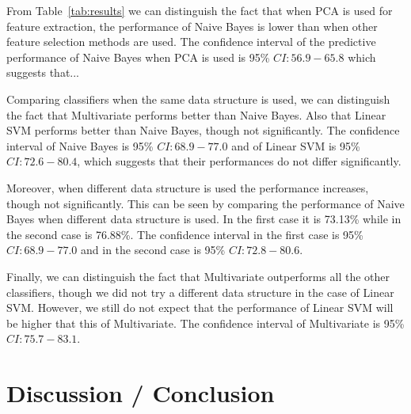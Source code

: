 \documentclass[preprint,journal,11pt]{vgtc}
\begin{document}
From Table~\ref{tab:results} we can distinguish the fact that when PCA is used for feature extraction, the performance of Naive Bayes is lower than when other feature selection methods are used. The confidence interval of the predictive performance of Naive Bayes when PCA is used is 95\% $CI: 56.9 - 65.8$ which suggests that...

Comparing classifiers when the same data structure is used, we can distinguish the fact that Multivariate performs better than Naive Bayes. Also that Linear SVM performs better than Naive Bayes, though not significantly. The confidence interval of Naive Bayes is 95\% $CI: 68.9-77.0$ and of Linear SVM is 95\% $CI: 72.6-80.4$, which suggests that their performances do not differ significantly.

Moreover, when different data structure is used the performance increases, though not significantly. This can be seen by comparing the performance of Naive Bayes when different data structure is used. In the first case it is 73.13\% while in the second case is 76.88\%. The confidence interval in the first case is 95\% $CI: 68.9 - 77.0$ and in the second case is 95\% $CI: 72.8 - 80.6$.

Finally, we can distinguish the fact that Multivariate outperforms all the other classifiers, though we did not try a different data structure in the case of Linear SVM. However, we still do not expect that the performance of Linear SVM will be higher that this of Multivariate. The confidence interval of Multivariate is 95\% $CI: 75.7-83.1$.

\section{Discussion / Conclusion}
\label{sec:discussion}
\end{document}
